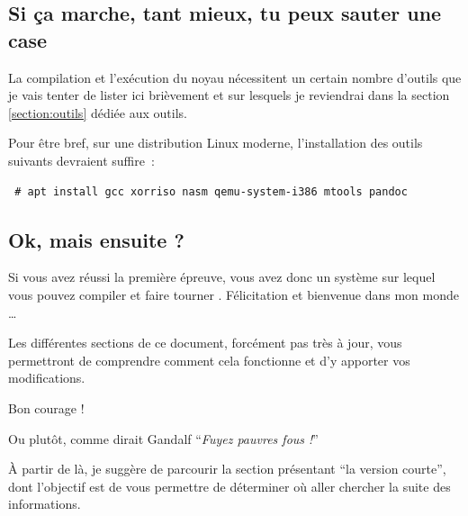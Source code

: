 \documentclass{article}
\begin{document}
%
\subsection{Si ça marche, tant mieux, tu peux sauter une case}

   La compilation et l’exécution du noyau nécessitent un certain
nombre d'outils que je vais tenter de lister ici brièvement et sur
lesquels je reviendrai dans la section \ref{section:outils} dédiée aux
outils.

   Pour être bref, sur une distribution Linux moderne, l'installation
des outils suivants devraient suffire~:
   
\begin{lstlisting}
 # apt install gcc xorriso nasm qemu-system-i386 mtools pandoc
\end{lstlisting}

%
\subsection{Ok, mais ensuite ?}

   Si vous avez réussi la première épreuve, vous avez donc un système
sur lequel vous pouvez compiler et faire tourner \manux. Félicitation
et bienvenue dans mon monde \ldots

   Les différentes sections de ce document, forcément pas très à jour,
vous permettront de comprendre comment cela fonctionne et d'y apporter
vos modifications.

Bon courage !

   Ou plutôt, comme dirait Gandalf ``{\em Fuyez pauvres fous !}''

   À partir de là, je suggère de parcourir la section présentant ``la
version courte'', dont l'objectif est de vous permettre de
déterminer où aller chercher la suite des informations.
\end{document}

